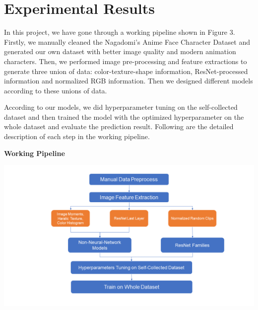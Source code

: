 \documentclass[11.5pt]{article}
\begin{document}
    \section{Experimental Results}
    \begin{minipage}{0.5\textwidth}
        In this project, we have gone through a working pipeline shown in Figure 3.
        Firstly, we manually cleaned the Nagadomi's Anime Face Character Dataset and generated our own dataset with better image quality and modern animation characters.
        Then, we performed image pre-processing and feature extractions to generate three union of data: color-texture-shape information, ResNet-processed information and normalized RGB information.
        Then we designed different models according to these unions of data.

        According to our models, we did hyperparameter tuning on the self-collected dataset and then trained the model with the optimized hyperparameter on the whole dataset and evaluate the prediction result.
        Following are the detailed description of each step in the working pipeline.
    \end{minipage}
    \begin{minipage}{0.5\textwidth}
        \begin{center}
            \textbf{Working Pipeline}
        \end{center}
        \includegraphics[width=\textwidth]{images/working_pipeline.png}
    \end{minipage}
\end{document}
